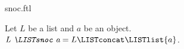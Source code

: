 \documentclass{naproche-library}
\begin{document}
\begin{smodule}[title=Snoc]{snoc.ftl}

\begin{definition}[forthel,id=SnocDef]
  Let $L$ be a list and $a$ be an object.
  $\emph{L \LISTsnoc a} = L \LISTconcat \LISTlist{a}$.
\end{definition}
\end{smodule}
\end{document}
